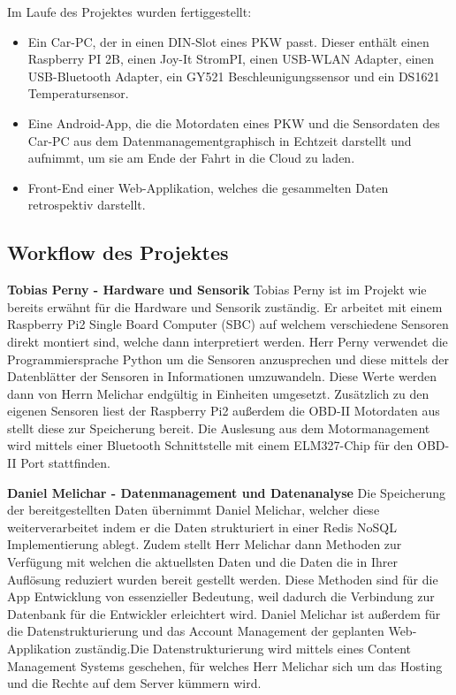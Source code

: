Im Laufe des Projektes wurden fertiggestellt:
\begin{itemize}
\item Ein Car-PC, der in einen DIN-Slot eines PKW passt. Dieser enthält einen Raspberry PI 2B,
einen Joy-It StromPI,
einen USB-WLAN Adapter,
einen USB-Bluetooth Adapter,
ein GY521 Beschleunigungssensor und
ein DS1621 Temperatursensor.
\item Eine Android-App, die die Motordaten eines PKW und die Sensordaten des Car-PC aus dem Datenmanagementgraphisch in Echtzeit darstellt und aufnimmt, um sie am Ende der Fahrt in die Cloud zu laden.
\item Front-End einer Web-Applikation, welches die gesammelten Daten retrospektiv darstellt.
\end{itemize}

\subsection{Workflow des Projektes}
	\textbf{Tobias Perny - Hardware und Sensorik\newline}
	Tobias Perny ist im Projekt wie bereits erwähnt für die Hardware und Sensorik zuständig. Er arbeitet mit einem Raspberry Pi2 Single Board Computer (SBC) auf welchem verschiedene Sensoren direkt montiert sind, welche dann interpretiert werden. Herr Perny verwendet die Programmiersprache Python um die Sensoren anzusprechen und diese mittels der Datenblätter der Sensoren in Informationen umzuwandeln. Diese Werte werden dann von Herrn Melichar endgültig in Einheiten umgesetzt.
	Zusätzlich zu den eigenen Sensoren liest der Raspberry Pi2 außerdem die OBD-II Motordaten aus stellt diese zur Speicherung bereit. 
	Die Auslesung aus dem Motormanagement wird mittels einer Bluetooth Schnittstelle mit einem ELM327-Chip für den OBD-II Port stattfinden.

	\textbf{Daniel Melichar - Datenmanagement und Datenanalyse\newline}
	Die Speicherung der bereitgestellten Daten übernimmt Daniel Melichar, welcher diese weiterverarbeitet indem er die Daten strukturiert in einer Redis NoSQL Implementierung ablegt. Zudem stellt Herr Melichar dann Methoden zur Verfügung mit welchen die aktuellsten Daten und die Daten die in Ihrer Auflösung reduziert wurden bereit gestellt werden. Diese Methoden sind für die App Entwicklung von essenzieller Bedeutung, weil dadurch die Verbindung zur Datenbank für die Entwickler erleichtert wird.
	Daniel Melichar ist außerdem für die Datenstrukturierung und das Account Management der geplanten Web-Applikation zuständig.Die Datenstrukturierung wird mittels eines Content Management Systems geschehen, für welches Herr Melichar sich um das Hosting und die Rechte auf dem Server kümmern wird. 

